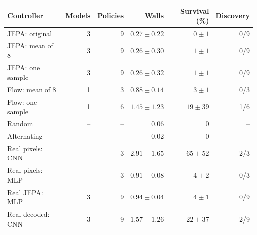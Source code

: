 \begin{tabular}{lrrrrr}
\toprule
\rowcolor{Navy!8}
Controller & Models & Policies & Walls & Survival (\%) & Discovery \\
\midrule
\rowcolor{JEPA!7}
JEPA: original & 3 & 9 & $0.27\pm0.22$ & $0\pm1$ & 0/9 \\
JEPA: mean of 8 & 3 & 9 & $0.26\pm0.30$ & $1\pm1$ & 0/9 \\
\rowcolor{JEPA!7}
JEPA: one sample & 3 & 9 & $0.26\pm0.32$ & $1\pm1$ & 0/9 \\
\midrule
\rowcolor{Flow!7}
Flow: mean of 8 & 1 & 3 & $0.88\pm0.14$ & $3\pm1$ & 0/3 \\
Flow: one sample & 1 & 6 & $1.45\pm1.23$ & $19\pm39$ & 1/6 \\
\midrule
Random & -- & -- & 0.06 & 0 & -- \\
Alternating & -- & -- & 0.02 & 0 & -- \\
\midrule
\rowcolor{Real!7}
Real pixels: CNN & -- & 3 & $2.91\pm1.65$ & $65\pm52$ & 2/3 \\
Real pixels: MLP & -- & 3 & $0.91\pm0.08$ & $4\pm2$ & 0/3 \\
\rowcolor{Real!7}
Real JEPA: MLP & 3 & 9 & $0.94\pm0.04$ & $4\pm1$ & 0/9 \\
Real decoded: CNN & 3 & 9 & $1.57\pm1.26$ & $22\pm37$ & 2/9 \\
\bottomrule
\end{tabular}
